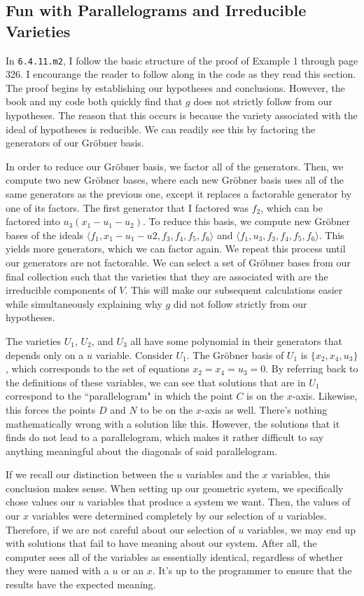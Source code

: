 \documentclass[12pt]{article}
\theoremstyle{plain}
\theoremstyle{definition}
\theoremstyle{remark}
\newcommand{\gro}{Gr\"obner }
\begin{document}
\subsection{Fun with Parallelograms and Irreducible Varieties}
In \texttt{6.4.11.m2}, I follow the basic structure of the proof of Example 1 through page 326. I encourange the reader to follow along in the code as they read this section.
The proof begins by establishing our hypotheses and conclusions.
However, the book and my code both quickly find that $g$ does not strictly follow from our hypotheses.
The reason that this occurs is because the variety associated with the ideal of hypotheses is reducible.
We can readily see this by factoring the generators of our \gro basis. 

In order to reduce our \gro basis, we factor all of the generators. 
Then, we compute two new \gro bases, where each new \gro basis uses all of the same generators as the previous one, except it replaces a factorable generator by one of its factors.
The first generator that I factored was $f_2$, which can be factored into $u_3(x_1 - u_1 - u_2)$.
To reduce this basis, we compute new \gro bases of the ideals $\langle f_1, x_1 - u_1 - u2, f_3, f_4, f_5, f_6 \rangle$ and $\langle f_1, u_3, f_3, f_4, f_5, f_6 \rangle$.
This yields more generators, which we can factor again. We repeat this process until our generators are not factorable. 
We can select a set of \gro bases from our final collection such that the varieties that they are associated with are the irreducible components of $V$.
This will make our subsequent calculations easier while simultaneously explaining why $g$ did not follow strictly from our hypotheses.

The varieties $U_1$, $U_2$, and $U_3$ all have some polynomial in their generators that depends only on a $u$ variable.
Consider $U_1$. The \gro basis of $U_1$ is $\{ x_2, x_4, u_3\}$, which corresponds to the set of equations $x_2 = x_4 = u_3 = 0$. 
By referring back to the definitions of these variables, we can see that solutions that are in $U_1$ correspond to the ``parallelogram" in which the point $C$ is on the $x$-axis.
Likewise, this forces the points $D$ and $N$ to be on the $x$-axis as well.
There's nothing mathematically wrong with a solution like this. 
However, the solutions that it finds do not lead to a parallelogram, which makes it rather difficult to say anything meaningful about the diagonals of said parallelogram.

If we recall our distinction between the $u$ variables and the $x$ variables, this conclusion makes sense.
When setting up our geometric system, we specifically chose values our $u$ variables that produce a system we want. 
Then, the values of our $x$ variables were determined completely by our selection of $u$ variables.
Therefore, if we are not careful about our selection of $u$ variables, we may end up with solutions that fail to have meaning about our system.
After all, the computer sees all of the variables as essentially identical, regardless of whether they were named with a $u$ or an $x$. 
It's up to the programmer to ensure that the results have the expected meaning.
\end{document}
